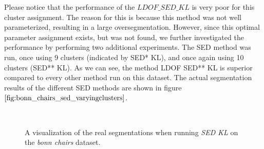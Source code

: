 Please notice that the performance of the $\textit{LDOF\_SED\_KL}$ is very poor for this cluster assignment. The reason for this is because this method was not well parameterized, resulting in a large oversegmentation. However, since this optimal parameter assignment exists, but was not found, we further investigated the performance by performing two additional experiments. The SED method was run, once using 9 clusters (indicated by SED* KL), and once again using 10 clusters (SED** KL). As we can see, the method LDOF SED** KL is superior compared to every other method run on this dataset. The actual segmentation results of the different SED methods are shown in figure $\ref{fig:bonn_chairs_sed_varyingclusters}$.
\begin{figure}[H]
\begin{center}
~
~
\end{center}
\caption[Bonn Chairs SED Segmentations for Varying Cluster Count]{A visualization of the real segmentations when running \textit{SED KL} on the \textit{bonn chairs} dataset.}
\label{fig:bonn_chairs_sed_varyingclusters}
\end{figure}


